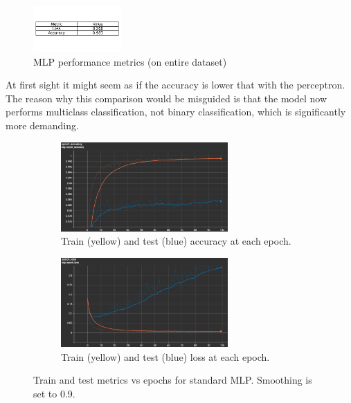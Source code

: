 \documentclass{article}
\begin{document}
\begin{figure}[h!]
    \centering
    \includegraphics[width=0.3\textwidth]{./plots/plot10.png}  %
    \caption{MLP performance metrics (on entire dataset)}
    \label{fig:plot8}  %
\end{figure}

At first sight it might seem as if the accuracy is lower that with the perceptron.
The reason why this comparison would be misguided is that the model now performs multiclass classification, not binary classification, which is significantly more demanding.

\begin{figure}[h!]
    \centering
    \begin{subfigure}[t]{\textwidth}
        \centering
        \includegraphics[width=0.7\textwidth]{./plots/screenshot1.png} %
        \caption{Train (yellow) and test (blue) accuracy at each epoch.}
        \label{fig:fig91}
    \end{subfigure}
    \vspace{0.2cm}
    \begin{subfigure}[t]{\textwidth}
        \centering
        \includegraphics[width=0.7\textwidth]{./plots/screenshot2.png} %
        \caption{Train (yellow) and test (blue) loss at each epoch.}
        \label{fig:fig92}
    \end{subfigure}
    \caption{Train and test metrics vs epochs for standard MLP. Smoothing is set to 0.9.}
    \label{fig:plot9}
\end{figure}
\end{document}

